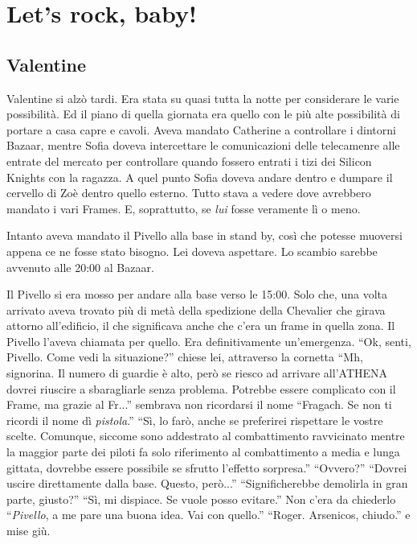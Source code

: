 \chapter{Let's rock, baby!}

  \section*{Valentine}
    
    Valentine si alzò tardi. Era stata su quasi tutta la notte per considerare le varie possibilità. Ed il piano di
    quella giornata era quello con le più alte possibilità di portare a casa capre e cavoli. Aveva mandato Catherine a
    controllare i dintorni Bazaar, mentre Sofia doveva intercettare le comunicazioni delle telecamenre alle entrate del
    mercato per controllare quando fossero entrati i tizi dei Silicon Knights con la ragazza. A quel punto Sofia doveva
    andare dentro e dumpare il cervello di Zoè dentro quello esterno. Tutto stava a vedere dove avrebbero mandato i vari
    Frames. E, soprattutto, se \emph{lui} fosse veramente lì o meno.

    Intanto aveva mandato il Pivello alla base in stand by, così che potesse muoversi appena ce ne fosse stato bisogno.
    Lei doveva aspettare. Lo scambio sarebbe avvenuto alle 20:00 al Bazaar.

    Il Pivello si era mosso per andare alla base verso le 15:00. Solo che, una volta arrivato aveva trovato più di metà
    della spedizione della Chevalier che girava attorno all'edificio, il che significava anche che c'era un frame in
    quella zona. Il Pivello l'aveva chiamata per quello. Era definitivamente un'emergenza. ``Ok, senti, Pivello. Come
    vedi la situazione?'' chiese lei, attraverso la cornetta ``Mh, signorina. Il numero di guardie è alto, però se
    riesco ad arrivare all'ATHENA dovrei riuscire a sbaragliarle senza problema. Potrebbe essere complicato con il
    Frame, ma grazie al Fr...'' sembrava non ricordarsi il nome ``Fragach. Se non ti ricordi il nome dì
    \emph{pistola}.'' ``Sì, lo farò, anche se preferirei rispettare le vostre scelte. Comunque, siccome sono addestrato
    al combattimento ravvicinato mentre la maggior parte dei piloti fa solo riferimento al combattimento a media e lunga
    gittata, dovrebbe essere possibile se sfrutto l'effetto sorpresa.'' ``Ovvero?'' ``Dovrei uscire direttamente dalla
    base. Questo, però...'' ``Significherebbe demolirla in gran parte, giusto?'' ``Sì, mi dispiace. Se vuole posso
    evitare.'' Non c'era da chiederlo ``\emph{Pivello}, a me pare una buona idea. Vai con quello.'' ``Roger. Arsenicos,
    chiudo.'' e mise giù.

